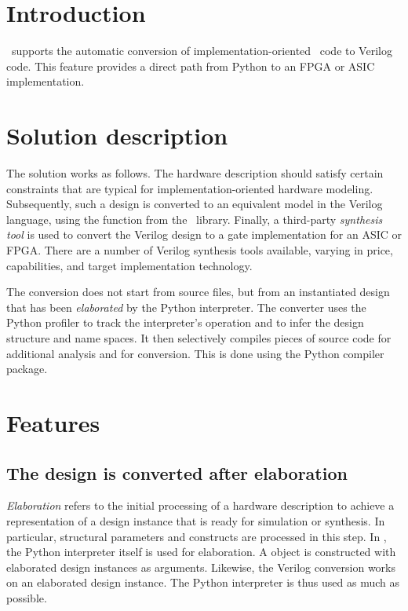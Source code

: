 \section{Introduction\label{conv-intro}}

\myhdl\ supports the automatic conversion of implementation-oriented
\myhdl\ code to Verilog code. This feature provides a
direct path from Python to an FPGA or ASIC implementation.

\section{Solution description\label{conv-solution}}

The solution works as follows. The hardware description should
satisfy certain constraints that are typical for
implementation-oriented hardware modeling.  Subsequently, such a
design is converted to an equivalent model in the Verilog language,
using the function  from the \myhdl\
library. Finally, a third-party \emph{synthesis tool} is used to
convert the Verilog design to a gate implementation for an ASIC or
FPGA. There are a number of Verilog synthesis tools available, varying
in price, capabilities, and target implementation technology.

The conversion does not start from source files, but from an
instantiated design that has been \emph{elaborated} by the Python
interpreter. The converter uses the Python profiler to track the
interpreter's operation and to infer the design structure and name
spaces. It then selectively compiles pieces of source code for
additional analysis and for conversion. This is done using the Python
compiler package.

\section{Features\label{conv-features}}

\subsection{The design is converted after elaboration\label{conv-features-elab}}
\emph{Elaboration} refers to the initial processing of a hardware
description to achieve a representation of a design instance that is
ready for simulation or synthesis. In particular, structural
parameters and constructs are processed in this step. In \myhdl{}, the
Python interpreter itself is used for elaboration.  A
 object is constructed with elaborated design
instances as arguments.  Likewise, the Verilog conversion works on an
elaborated design instance. The Python interpreter is thus used as
much as possible.

